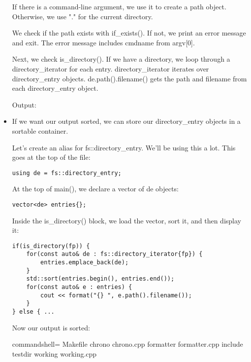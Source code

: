 \begin{itemize}
If there is a command-line argument, we use it to create a path object. Otherwise, we use "." for the current directory.

We check if the path exists with if\_exists(). If not, we print an error message and exit. The error message includes cmdname from argv[0].

Next, we check is\_directory(). If we have a directory, we loop through a directory\_iterator for each entry. directory\_iterator iterates over directory\_entry objects. de.path().filename() gets the path and filename from each directory\_entry object.

Output:


\item 
If we want our output sorted, we can store our directory\_entry objects in a sortable container.

Let's create an alias for fs::directory\_entry. We'll be using this a lot. This goes at the top of the file:

\begin{lstlisting}[style=styleCXX]
using de = fs::directory_entry;
\end{lstlisting}

At the top of main(), we declare a vector of de objects:

\begin{lstlisting}[style=styleCXX]
vector<de> entries{};
\end{lstlisting}

Inside the is\_directory() block, we load the vector, sort it, and then display it:

\begin{lstlisting}[style=styleCXX]
if(is_directory(fp)) {
	for(const auto& de : fs::directory_iterator{fp}) {
		entries.emplace_back(de);
	}
	std::sort(entries.begin(), entries.end());
	for(const auto& e : entries) {
		cout << format("{} ", e.path().filename());
	}
} else { ...
\end{lstlisting}

Now our output is sorted:

\begin{tcblisting}{commandshell={}}
Makefile chrono chrono.cpp formatter formatter.cpp
include testdir working working.cpp
\end{tcblisting}


\end{itemize}
